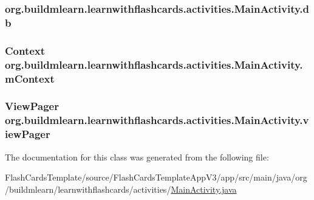 \subsubsection[{\texorpdfstring{db}{db}}]{ org.\+buildmlearn.\+learnwithflashcards.\+activities.\+Main\+Activity.\+db\hspace{0.3cm}{\ttfamily [private]}}\hypertarget{classorg_1_1buildmlearn_1_1learnwithflashcards_1_1activities_1_1MainActivity_a9ea1bef0aa79331e734c7134f333b9cd}{}\label{classorg_1_1buildmlearn_1_1learnwithflashcards_1_1activities_1_1MainActivity_a9ea1bef0aa79331e734c7134f333b9cd}
\subsubsection[{\texorpdfstring{m\+Context}{mContext}}]{\setlength{\rightskip}{0pt plus 5cm}Context org.\+buildmlearn.\+learnwithflashcards.\+activities.\+Main\+Activity.\+m\+Context\hspace{0.3cm}{\ttfamily [private]}}\hypertarget{classorg_1_1buildmlearn_1_1learnwithflashcards_1_1activities_1_1MainActivity_ad1ea3fb26eca3f6fe4efe826b5ec0e15}{}\label{classorg_1_1buildmlearn_1_1learnwithflashcards_1_1activities_1_1MainActivity_ad1ea3fb26eca3f6fe4efe826b5ec0e15}
\subsubsection[{\texorpdfstring{view\+Pager}{viewPager}}]{\setlength{\rightskip}{0pt plus 5cm}View\+Pager org.\+buildmlearn.\+learnwithflashcards.\+activities.\+Main\+Activity.\+view\+Pager\hspace{0.3cm}{\ttfamily [private]}}\hypertarget{classorg_1_1buildmlearn_1_1learnwithflashcards_1_1activities_1_1MainActivity_a6d17a36f7401040c4bdd416dfdeb8acf}{}\label{classorg_1_1buildmlearn_1_1learnwithflashcards_1_1activities_1_1MainActivity_a6d17a36f7401040c4bdd416dfdeb8acf}


The documentation for this class was generated from the following file\+:\begin{DoxyCompactItemize}
\item 
Flash\+Cards\+Template/source/\+Flash\+Cards\+Template\+App\+V3/app/src/main/java/org/buildmlearn/learnwithflashcards/activities/\hyperlink{FlashCardsTemplate_2source_2FlashCardsTemplateAppV3_2app_2src_2main_2java_2org_2buildmlearn_2lea662cfb7ae014a144960116dfe6806ec9}{Main\+Activity.\+java}\end{DoxyCompactItemize}
